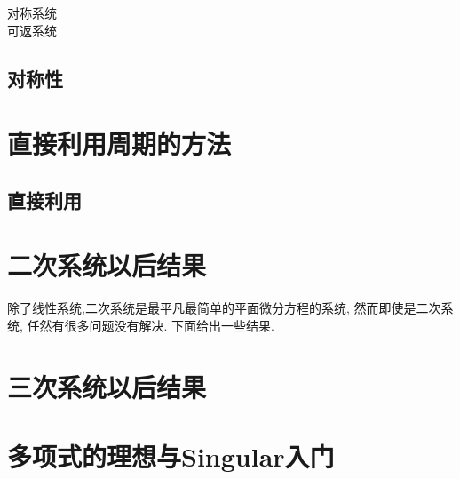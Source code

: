 \begin{description}
\item[对称系统]
\item[可返系统]
\end{description}
\subsection{对称性}

\section{直接利用周期的方法}
\subsection{直接利用}

\section{二次系统以后结果}
除了线性系统,二次系统是最平凡最简单的平面微分方程的系统,
然而即使是二次系统,
任然有很多问题没有解决.
下面给出一些结果.


\begin{theorem}

\end{theorem}

\section{三次系统以后结果}
\begin{theorem}

\end{theorem}

\section{多项式的理想与Singular入门}

